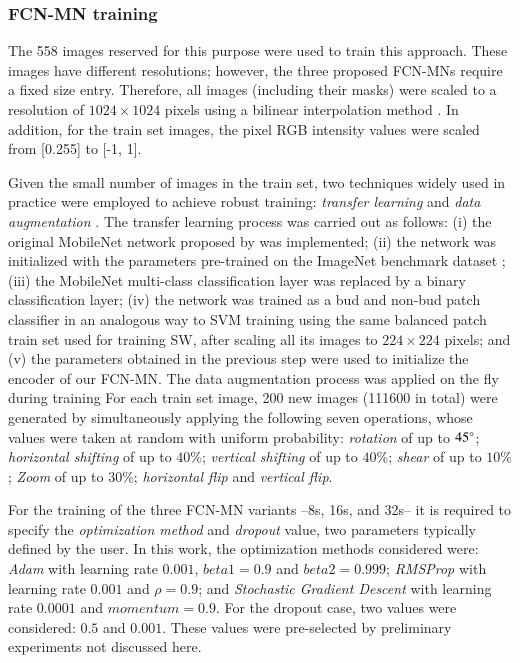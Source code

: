 \documentclass[a4paper,authoryear,review]{elsarticle}
\begin{document}
	\subsubsection{FCN-MN training}
	\label{sec:fcntrain}
	
	The 558 images reserved for this purpose were used to train this approach. These images have different resolutions; however, the three proposed FCN-MNs require a fixed size entry. Therefore, all images (including their masks) were scaled to a resolution of $1024 \times 1024$ pixels using a bilinear interpolation method \citep{han2013comparison}. In addition, for the train set images, the pixel RGB intensity values were scaled from [0.255] to [-1, 1].
	
	Given the small number of images in the train set, two techniques widely used in practice were employed to achieve robust training: \emph{transfer learning} \citep{pan2009survey} and \emph{data augmentation} \citep{shorten2019survey}. The transfer learning process was carried out as follows: (i) the original  MobileNet network proposed by \citet{howard2017mobilenets} was implemented; (ii) the network was initialized with the parameters pre-trained on the ImageNet benchmark dataset \citep{kornblith2019better}; (iii) the MobileNet multi-class classification layer was replaced by a binary classification layer; (iv) the network was trained as a bud and non-bud patch classifier in an analogous way to SVM training using the same balanced patch train set used for training SW, after scaling all its images to $224 \times 224$ pixels; and (v) the parameters obtained in the previous step were used to initialize the encoder of our FCN-MN. The data augmentation process was applied on the fly during training For each train set image, 200 new images (111600 in total) were generated by simultaneously applying the following seven operations, whose values were taken at random with uniform probability: \emph{rotation} of up to $45\degree$; \emph{horizontal shifting} of up to $40\%$; \emph{vertical shifting} of up to $40\%$; \emph{shear} of up to $10\%$; \emph{Zoom} of up to $30\%$;  \emph{horizontal flip} and \emph{vertical flip}. 
	
	For the training of the three  FCN-MN variants --8s, 16s, and 32s-- it is required to specify the \emph{optimization method} and \emph{dropout} value, two parameters typically defined by the user. In this work, the optimization methods considered were: \emph{Adam} with learning rate $0.001$, $beta1 = 0.9$ and $beta2 = 0.999$; \emph{RMSProp} with learning rate $0.001$ and $\rho = 0.9$; and \emph{Stochastic Gradient Descent} with learning rate $0.0001$ and $momentum = 0.9$. For the dropout case, two values were considered: $0.5$ and $0.001$. These values were pre-selected by preliminary experiments not discussed here.
	
\end{document}
